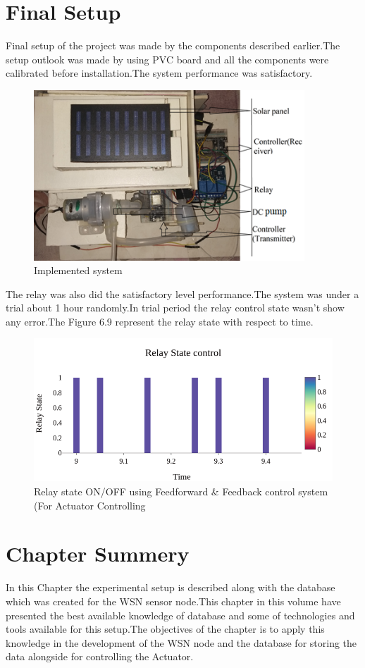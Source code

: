 \section{Final Setup}
Final setup of the project was made by the components described earlier.The setup outlook was made by using PVC board and all the components were calibrated before installation.The system performance was satisfactory.
\begin{figure}[H]
  \centering
  \includegraphics[width=4in]{44}
  \caption{Implemented system  }\label{fig44}
\end{figure}
The relay was also did the satisfactory level performance.The system was under a trial about 1 hour randomly.In trial period the relay control state wasn't show any error.The Figure 6.9 represent the relay state with respect to time.
\begin{figure}[h]
  \centering
  \includegraphics[width=4 in]{47}
  \caption{Relay state ON/OFF using Feedforward \& Feedback control system (For Actuator Controlling}\label{fig46}
\end{figure}

\section{Chapter Summery}
In this Chapter the experimental setup is described along with the database which was created for the WSN sensor node.This chapter in this volume have presented the best available knowledge of database and some of technologies and tools available for this setup.The objectives of the chapter is to apply this knowledge in the development of the WSN node and the database for storing the data alongside for controlling the Actuator.  